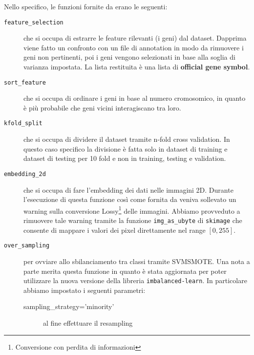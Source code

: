 Nello specifico, le funzioni fornite da \cite{lyu2018deep} erano le seguenti:
\begin{description}
	\item[\texttt{feature\_selection}] che si occupa di estrarre le feature rilevanti (i geni) dal dataset.
                                       Dapprima viene fatto un confronto con un file di annotation in modo da
                                       rimuovere i geni non pertinenti, poi i geni vengono selezionati in base alla
                                       soglia di varianza impostata. 
                                       La lista restituita è una lista di \textbf{official gene symbol}.
	\item[\texttt{sort\_feature}] che si occupa di ordinare i geni in base al numero cromosomico, in quanto è più
                                  probabile che geni vicini interagiscano tra loro.
	\item[\texttt{kfold\_split}] che si occupa di dividere il dataset tramite n-fold cross validation. 
                                 In questo caso specifico la divisione è fatta solo in dataset di training e dataset 
                                 di testing per 10 fold e non in training, testing e validation.
	\item[\texttt{embedding\_2d}] che si occupa di fare l'embedding dei dati nelle immagini 2D. 
                                  Durante l'esecuzione di questa funzione così come fornita da \cite{lyu2018deep} 
                                  veniva sollevato un warning sulla conversione Lossy\footnote{Conversione con perdita
                                  di informazioni} delle immagini. 
                                  Abbiamo provveduto a rimuovere tale warning tramite la funzione 
                                  \texttt{img\_as\_ubyte} di \texttt{skimage} 
                                  che consente di mappare i valori dei pixel direttamente nel range $[0, 255]$.
	\item[\texttt{over\_sampling}] per ovviare allo sbilanciamento tra classi tramite SVMSMOTE. 
                                   Una nota a parte merita questa funzione in quanto è stata aggiornata per poter
                                   utilizzare la nuova versione della libreria \texttt{imbalanced-learn}. 
                                   In particolare abbiamo impostato i seguenti parametri:
                                   \begin{description}
                                       \item[sampling\_strategy='minority'] al fine effettuare il resampling 

\end{description}
\end{description}

